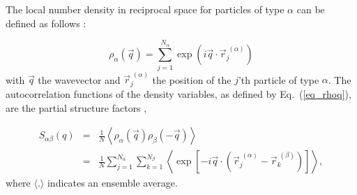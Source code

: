     The local number density in reciprocal space for particles of type $\alpha$ can be defined as follows \cite{hansen2013}:

    \begin{equation}
    \rho_{\alpha} (\vec{q}) = \sum_{j=1}^{N_{\alpha}} \exp \left( i \vec{q} \cdot {\vec{r}_j^{\; (\alpha)}} \right)
    \label{eq_rhoq}
    \end{equation}
    with $\vec{q}$ the wavevector and {$\vec{r}_j^{\; (\alpha)}$} the position of the $j$'th particle of type $\alpha$. The autocorrelation functions of the density variables, as defined by Eq.~(\ref{eq_rhoq}), are the partial structure factors \cite{hansen2013},
    
    
    \begin{eqnarray}
    S_{\alpha \beta}(q) & = & \frac{1}{N} \left\langle \rho_{\alpha}(\vec{q}) \rho_{\beta}(- \vec{q}) \right\rangle \nonumber \\  
    & = & {\frac{1}{N}  \sum_{j=1}^{N_\alpha}  \sum_{k=1}^{N_\beta} \left\langle \exp\left[ - i \vec{q} \cdot \left( \vec{r}_j^{\; (\alpha)} - \vec{r}_k^{\; (\beta)} \right) \right] \right\rangle},
    \label{eq_spart}
    \end{eqnarray}
    where $\langle . \rangle$ indicates an ensemble average.
    
